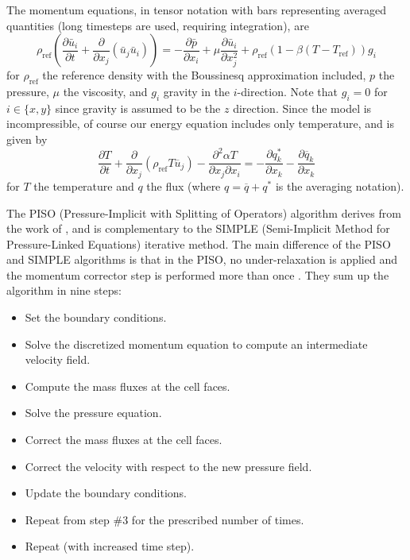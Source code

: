 \documentclass[10pt,letterpaper]{article}
\newcommand{\partialdiff}[2]{\frac{\partial #1}{\partial #2}}
\newcommand{\rhoref}{\rho_{\text{ref}}}
\begin{document}
The momentum equations, in tensor notation with bars representing averaged quantities (long timesteps are used, requiring integration), are
\begin{equation} \rho_\text{ref} \left ( \frac{\partial \bar{u}_i}{\partial t} + \frac{\partial}{\partial x_j} \left( \bar{u}_j \bar{u}_i \right) \right )
= -\frac{\partial \bar{p}} {\partial{x_i}} +  \mu \frac{\partial \bar{u}_i}{\partial x_j^2} + \rhoref \left(1 - \beta (T - T_\text{ref})\right) g_i \end{equation}
for $\rho_\text{ref}$ the reference density with the Boussinesq approximation included, $p$ the pressure, $\mu$ the viscosity, and $g_i$ gravity in the $i$-direction.
Note that $g_i = 0$ for $i \in \{ x,y\}$ since gravity is assumed to be the $z$ direction.
Since the model is incompressible, of course our energy equation includes only temperature, and is given by
                            \begin{equation} \partialdiff{T}{t} + \partialdiff{}{x_j} \left ( \rhoref T \overline{u}_j \right ) - \frac{\partial ^2 \alpha T}{\partial x_j \partial x_i}
  =
  - \frac{\partial q_k^*}{\partial x_k}
  - \frac{\partial \overline{q}_k}{\partial x_k}
\end{equation}
for $T$ the temperature and $q$ the flux (where $q = \overline{q} + q^*$ is the averaging notation).

The PISO (Pressure-Implicit with Splitting of Operators) algorithm derives from the work of \cite{issa1986solution}, and is complementary to the SIMPLE (Semi-Implicit Method for Pressure-Linked Equations) \cite{patankar1972calculation} iterative method.
The main difference of the PISO and SIMPLE algorithms is that in the PISO, no under-relaxation is applied and the momentum corrector step is performed more than once \cite{ferziger1996computational}.
They sum up the algorithm in nine steps:
\begin{itemize}
\item Set the boundary conditions.
\item Solve the discretized momentum equation to compute an intermediate velocity field.
\item Compute the mass fluxes at the cell faces.
\item Solve the pressure equation.
\item Correct the mass fluxes at the cell faces.
\item Correct the velocity with respect to the new pressure field.
\item Update the boundary conditions.
\item Repeat from step \#3 for the prescribed number of times.
\item Repeat (with increased time step).
\end{itemize}
\end{document}
